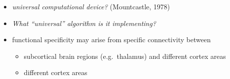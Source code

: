 \documentclass[8pt,t,usepdftitle=false]{beamer}
\def\figpath{\src/figures}
\begin{document}
\begin{frame}[t,plain]
\begin{itemize}
{{        
      }}    
  \item<4->[$\curvearrowright$] \emph{universal computational device?} {\tiny\color{gray}(Mountcastle, 1978)}\\[1ex]
  \item<5-> \emph{\Large What ``universal'' algorithm is it implementing?}\\[1ex]
  \item<6-> functional specificity may arise from specific connectivity between
    \begin{itemize}
    \item subcortical brain regions (e.g.~thalamus)
      and different cortex areas
    \item different cortex areas
    \end{itemize}
  \end{itemize}
\end{frame}
\def\ttl{Properties of cortical networks -- an overview}
\end{document}
